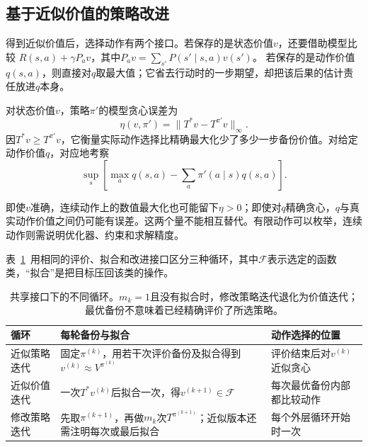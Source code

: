 \subsection{基于近似价值的策略改进}
\label{sec:rl-planning-approximate-improvement}

得到近似价值后，选择动作有两个接口。若保存的是状态价值$v$，还要借助模型比较
$R(s,a)+\gamma P_av$，其中$P_av=\sum_{s'}P(s'\mid s,a)v(s')$。
若保存的是动作价值$q(s,a)$，则直接对$q$取最大值；它省去行动时的一步期望，却把该后果的估计责任放进$q$本身。

\begin{definition}[近似贪心误差]
 \label{def:rl-planning-greedy-error}
 对状态价值$v$，策略$\pi'$的模型贪心误差为
 \[
 \eta(v,\pi')=\lVert T^*v-T^{\pi'}v\rVert_\infty.
 \]
 因$T^*v\geq T^{\pi'}v$，它衡量实际动作选择比精确最大化少了多少一步备份价值。对给定动作价值$q$，对应地考察
 \[
  \sup_s\left[\max_a q(s,a)-\sum_a\pi'(a\mid s)q(s,a)\right].
 \]
\end{definition}

即使$v$准确，连续动作上的数值最大化也可能留下$\eta>0$；即使对$q$精确贪心，$q$与真实动作价值之间仍可能有误差。这两个量不能相互替代。有限动作可以枚举，连续动作则需说明优化器、约束和求解精度。

表~\ref{tab:rl-planning-approximate-loops}~用相同的评价、拟合和改进接口区分三种循环，其中$\mathcal F$表示选定的函数类，“拟合”是把目标压回该类的操作。

\begin{table}[htbp]
 \centering
 \small
 \begin{tabularx}{\linewidth}{@{}l>{\raggedright\arraybackslash}X>{\raggedright\arraybackslash}X@{}}
  \toprule
  循环 & 每轮备份与拟合 & 动作选择的位置\\
  \midrule
  近似策略迭代 & 固定$\pi^{(k)}$，用若干次评价备份及拟合得到$v^{(k)}\approx V^{\pi^{(k)}}$ & 评价结束后对$v^{(k)}$近似贪心\\
  近似价值迭代 & 一次$T^*v^{(k)}$后拟合一次，得$v^{(k+1)}\in\mathcal F$ & 每次最优备份内部都比较动作\\
  修改策略迭代 & 先取$\pi^{(k+1)}$，再做$m_k$次$T^{\pi^{(k+1)}}$；近似版本还需注明每次或最后拟合 & 每个外层循环开始时一次\\
  \bottomrule
 \end{tabularx}
 \caption{共享接口下的不同循环。$m_k=1$且没有拟合时，修改策略迭代退化为价值迭代；最优备份不意味着已经精确评价了所选策略。}
 \label{tab:rl-planning-approximate-loops}
\end{table}

